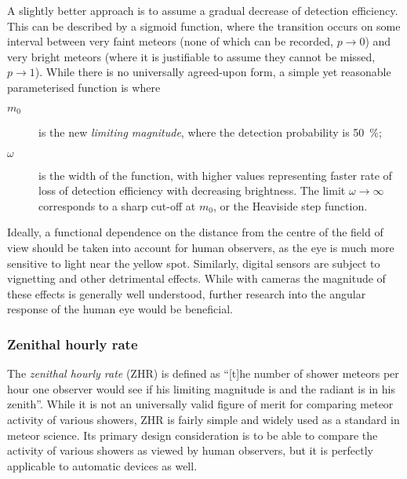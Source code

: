             A slightly better approach is to assume a gradual decrease of detection efficiency.
            This can be described by a sigmoid function, where the transition occurs on some interval
            between very faint meteors (none of which can be recorded, $p \to 0$)
            and very bright meteors (where it is justifiable to assume they cannot be missed, $p \to 1$).
            While there is no universally agreed-upon form, a simple yet reasonable parameterised function is \citep{jedicke+1997}
            where
            \begin{description}
                \item[$m_0$]    is the new \emph{limiting magnitude}, where the detection probability is \SI{50}{\percent};
                \item[$\omega$] is the width of the function, with higher values representing
                    faster rate of loss of detection efficiency with decreasing brightness.
                    The limit $\omega \to \infty$ corresponds to a sharp cut-off at $m_0$,
                    or the Heaviside step function.
            \end{description}

            Ideally, a functional dependence on the distance from the centre of the field
            of view should be taken into account for human observers, as the eye is much more
            sensitive to light near the yellow spot.
            Similarly, digital sensors are subject to vignetting and other detrimental effects.
            While with cameras the magnitude of these effects is generally well understood,
            further research into the angular response of the human eye would be beneficial.

        \subsubsection{Zenithal hourly rate} \label{msaz}
            The \emph{zenithal hourly rate} (ZHR) is defined as ``[t]he number of shower meteors per hour
            one observer would see if his limiting magnitude is  and the radiant is in his zenith''.
            While it is not an universally valid figure of merit for comparing meteor activity of various showers,
            ZHR is fairly simple and widely used as a standard in meteor science.
            Its primary design consideration is to be able to compare the activity of various showers
            as viewed by human observers, but it is perfectly applicable to automatic devices as well.

